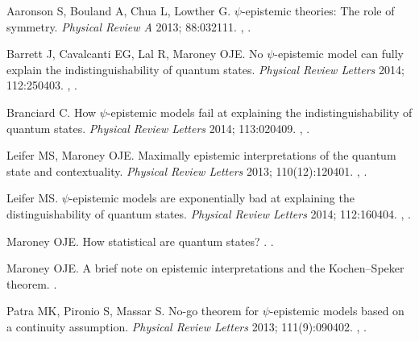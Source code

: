 \documentclass[DIV=calc,paper=a4,fontsize=11pt,twocolumn]{scrartcl} %
\theoremstyle{definition}
\theoremstyle{plain}
\begin{document}
\begin{thebibliography}{10}
Aaronson S, Bouland A, Chua L, Lowther G.
\newblock $\psi$-epistemic theories: The role of symmetry.
\newblock \emph{Physical Review A} 2013; 88:032111.
\newblock \href {http://arxiv.org/abs/1303.2834} {},
\href {http://dx.doi.org/10.1103/PhysRevA.88.032111}
{}.

Barrett J, Cavalcanti EG, Lal R, Maroney OJE.
\newblock No $\psi$-epistemic model can fully explain the indistinguishability
of quantum states.
\newblock \emph{Physical Review Letters} 2014; 112:250403.
\newblock \href {http://arxiv.org/abs/1310.8302} {},
\href {http://dx.doi.org/10.1103/PhysRevLett.112.250403}
{}.

Branciard C.
\newblock How $\psi$-epistemic models fail at explaining the
indistinguishability of quantum states.
\newblock \emph{Physical Review Letters} 2014; 113:020409.
\newblock \href {http://arxiv.org/abs/1407.3005} {},
\href {http://dx.doi.org/10.1103/PhysRevLett.113.020409}
{}.

Leifer MS, Maroney OJE.
\newblock Maximally epistemic interpretations of the quantum state and
contextuality.
\newblock \emph{Physical Review Letters} 2013; 110(12):120401.
\newblock \href {http://arxiv.org/abs/1208.5132} {},
\href {http://dx.doi.org/10.1103/PhysRevLett.110.120401}
{}.

Leifer MS.
\newblock $\psi$-epistemic models are exponentially bad at explaining the
distinguishability of quantum states.
\newblock \emph{Physical Review Letters} 2014; 112:160404.
\newblock \href {http://arxiv.org/abs/1401.7996} {},
\href {http://dx.doi.org/10.1103/PhysRevLett.112.160404}
{}.

Maroney OJE.
\newblock How statistical are quantum states?
.
\newblock \href {http://arxiv.org/abs/1207.6906} {}.

Maroney OJE.
\newblock A brief note on epistemic interpretations and the Kochen--Speker theorem.
\newblock \href {http://arxiv.org/abs/1207.7192} {}.

Patra MK, Pironio S, Massar S.
\newblock No-go theorem for $\psi$-epistemic models based on a continuity
assumption.
\newblock \emph{Physical Review Letters} 2013; 111(9):090402.
\newblock \href {http://arxiv.org/abs/1211.1179} {},
\href {http://dx.doi.org/10.1103/PhysRevLett.111.090402}
{}.


\end{thebibliography}
\end{document}
